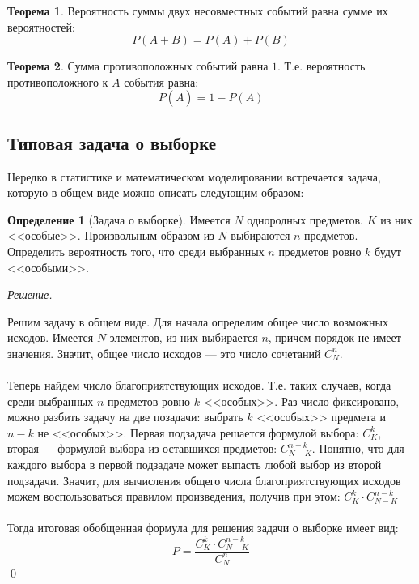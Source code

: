 \documentclass[12pt,a4paper]{article}
\theoremstyle{definition}
\newtheorem{definition}{Определение}[section]
\theoremstyle{definition}
\newtheorem{theorem}{Теорема}[section]
\theoremstyle{remark}
\theoremstyle{corollary}
\theoremstyle{bolditalic}
\newenvironment{solution}{
    \vspace{0.5em}
    \noindent\textit{Решение.}
}{\qed\vspace{1em}}
\begin{document}
\begin{theorem}
    Вероятность суммы двух несовместных событий равна сумме их вероятностей:
    \[
    P(A+B)=P(A)+P(B)
    \]
\end{theorem}

\begin{theorem}
    Сумма противоположных событий равна $1$. Т.е. вероятность противоположного к $A$ события равна:
    \[
    P(\overline{A})=1-P(A)
    \]
\end{theorem}

\subsection{Типовая задача о выборке}

Нередко в статистике и математическом моделировании встречается задача, которую в общем виде можно описать следующим образом:

\begin{definition}[Задача о выборке]
    Имеется $N$ однородных предметов. $K$ из них <<особые>>. Произвольным образом из $N$ выбираются $n$ предметов. Определить вероятность того, что среди выбранных $n$ предметов ровно $k$ будут <<особыми>>. 
\end{definition}

\begin{solution}
    Решим задачу в общем виде. Для начала определим общее число возможных исходов. Имеется $N$ элементов, из них выбирается $n$, причем порядок не имеет значения. Значит, общее число исходов --- это число сочетаний $C_N^{n}$.\\\\
    Теперь найдем число благоприятствующих исходов. Т.е. таких случаев, когда среди выбранных $n$ предметов ровно $k$ <<особых>>. Раз число фиксировано, можно разбить задачу на две позадачи: выбрать $k$ <<особых>> предмета и $n-k$ не <<особых>>. Первая подзадача решается формулой выбора: $C_K^k$, вторая --- формулой выбора из оставшихся предметов: $C_{N-K}^{n-k}$. Понятно, что для каждого выбора в первой подзадаче может выпасть любой выбор из второй подзадачи. Значит, для вычисления общего числа благоприятствующих исходов можем воспользоваться правилом произведения, получив при этом: $C_K^k \cdot C_{N-K}^{n-k}$\\\\
    Тогда итоговая обобщенная формула для решения задачи о выборке имеет вид:
    \[
    P = \frac{C_K^k \cdot C_{N-K}^{n-k}}{C_N^{n}}
    \]
\end{solution}
\end{document}
